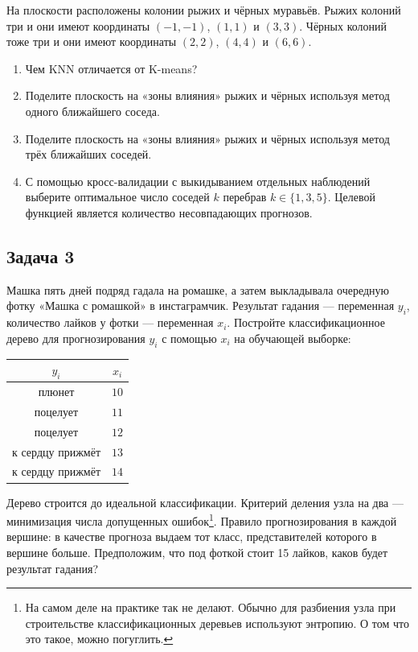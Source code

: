 \documentclass[12pt, a4paper, oneside]{article}
\begin{document}
На плоскости расположены колонии рыжих и чёрных муравьёв. Рыжих колоний три и они имеют координаты $(-1, -1)$, $(1, 1)$ и $(3, 3)$. Чёрных колоний тоже три и они имеют координаты $(2, 2)$, $(4, 4)$ и $(6, 6)$.

\begin{enumerate}
	\item Чем KNN отличается от K-means? 
	\item Поделите плоскость на «зоны влияния» рыжих и чёрных используя метод одного ближайшего соседа.
	\item Поделите плоскость на «зоны влияния» рыжих и чёрных используя метод трёх ближайших соседей.
	\item С помощью кросс-валидации с выкидыванием отдельных наблюдений выберите оптимальное число соседей $k$ перебрав $k \in \{1, 3, 5\}$. Целевой функцией является количество несовпадающих прогнозов.
\end{enumerate}

\subsection*{Задача 3}

Машка пять дней подряд гадала на ромашке, а затем выкладывала очередную фотку «Машка с ромашкой» в инстаграмчик. Результат гадания — переменная $y_i$, количество лайков у фотки — переменная $x_i$. Постройте классификационное дерево для прогнозирования $y_i$ с помощью $x_i$ на обучающей выборке:

\begin{center}
\begin{tabular}{cc}
	$y_i$ & $x_i$ \\
	\hline
	плюнет & $10$ \\
	поцелует & $11$ \\
	поцелует & $12$ \\
	к сердцу прижмёт & $13$ \\
	к сердцу прижмёт & $14$ \\
\end{tabular}
\end{center}

Дерево строится до идеальной классификации. Критерий деления узла на два — минимизация числа допущенных ошибок\footnote{На самом деле на практике так не делают. Обычно для разбиения узла при строительстве классификационных деревьев используют энтропию. О том что это такое, можно погуглить.}.  Правило прогнозирования в каждой вершине: в качестве прогноза выдаем тот класс, представителей которого в вершине больше.  Предположим, что под фоткой стоит 15 лайков, каков будет результат гадания? 
\end{document}
